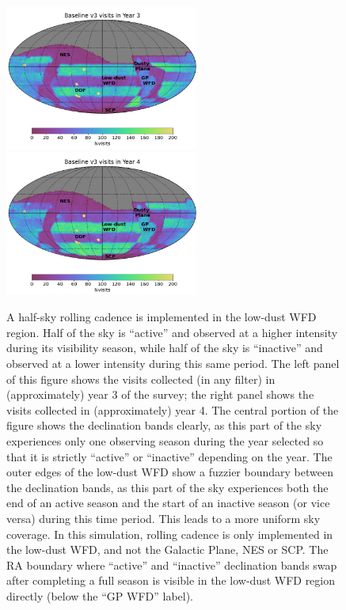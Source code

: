 \begin{figure}[t!]
    \centering
    \includegraphics[width=2.5in]{figures/v3footprint_yr3.png}
    \includegraphics[width=2.5in]{figures/v3footprint_yr4.png}
    \caption{A half-sky rolling cadence is implemented in the low-dust WFD region. Half of the sky is ``active'' and observed at a higher intensity during its visibility season, while half of the sky is ``inactive'' and observed at a lower intensity during this same period. The left panel of this figure shows the visits  collected (in any filter) in (approximately) year 3 of the survey; the right panel shows the visits collected in (approximately) year 4. The central portion of the figure shows the declination bands clearly, as this part of the sky experiences only one observing season during the year selected so that it is strictly ``active'' or ``inactive'' depending on the year.  The outer edges of the low-dust WFD show a fuzzier boundary between the declination bands, as this part of the sky %
    experiences both the end of an active season and the start of an inactive season (or vice versa) during this time period. This leads to a more uniform sky coverage. In this simulation, rolling cadence is only implemented in the low-dust WFD, and not the Galactic Plane, NES or SCP. The RA boundary where ``active'' and ``inactive'' declination bands swap after completing a full season is visible in the low-dust WFD region directly (below the ``GP WFD'' label). }\label{fig:baselinev3Rolling}
\end{figure}

